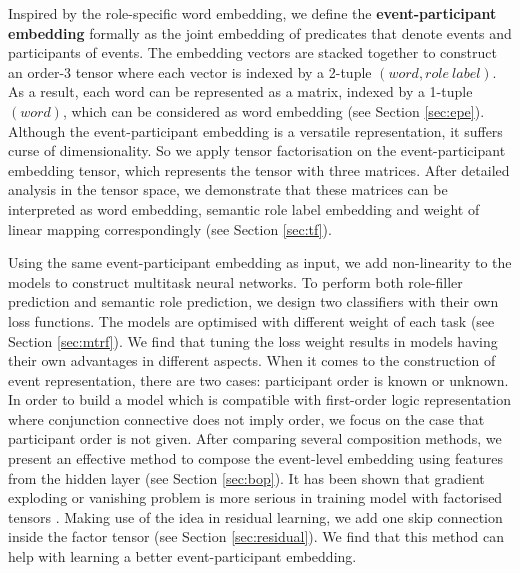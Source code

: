 \documentclass[a4paper]{article}
\begin{document}
Inspired by the role-specific word embedding, we define the \textbf{event-participant embedding} formally as the joint embedding of predicates that denote events and participants of events. The embedding vectors are stacked together to construct an order-3 tensor where each vector is indexed by a 2-tuple $(word, role\ label)$. As a result, each word can be represented as a matrix, indexed by a 1-tuple $(word)$, which can be considered as word embedding (see Section \ref{sec:epe}). Although the event-participant embedding is a versatile representation, it suffers curse of dimensionality. So we apply tensor factorisation on the event-participant embedding tensor, which represents the tensor with three matrices. After detailed analysis in the tensor space, we demonstrate that these matrices can be interpreted as word embedding, semantic role label embedding and weight of linear mapping correspondingly (see Section \ref{sec:tf}). 

Using the same event-participant embedding as input, we add non-linearity to the models to construct multitask neural networks. To perform both role-filler prediction and semantic role prediction, we design two classifiers with their own loss functions. The models are optimised with different weight of each task (see Section \ref{sec:mtrf}). We find that tuning the loss weight results in models having their own advantages in different aspects. When it comes to the construction of event representation, there are two cases: participant order is known or unknown. In order to build a model which is compatible with first-order logic representation where conjunction connective does not imply order, we focus on the case that participant order is not given. After comparing several composition methods, we present an effective method to compose the event-level embedding using features from the hidden layer (see Section \ref{sec:bop}). It has been shown that gradient exploding or vanishing problem is more serious in training model with factorised tensors \citep{sutskever2011generating}.  Making use of the idea in residual learning, we add one skip connection inside the factor tensor (see Section \ref{sec:residual}). We find that this method can help with learning a better event-participant embedding.
\end{document}
